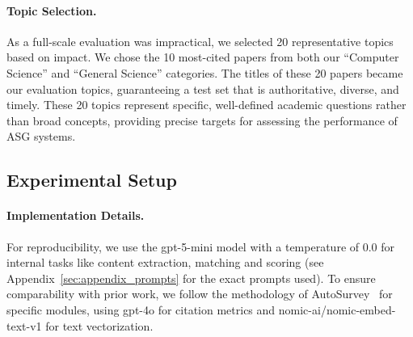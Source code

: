 \documentclass[11pt]{article}
\begin{document}




\paragraph{Topic Selection.} As a full-scale evaluation was impractical, we selected 20 representative topics based on impact. We chose the 10 most-cited papers from both our ``Computer Science'' and ``General Science'' categories. The titles of these 20 papers became our evaluation topics, guaranteeing a test set that is authoritative, diverse, and timely. These 20 topics represent specific, well-defined academic questions rather than broad concepts, providing precise targets for assessing the performance of ASG systems.






\subsection{Experimental Setup}

\paragraph{Implementation Details.} For reproducibility, we use the gpt-5-mini model with a temperature of $0.0$ for internal tasks like content extraction, matching and scoring (see Appendix~\ref{sec:appendix_prompts} for the exact prompts used).
To ensure comparability with prior work, we follow the methodology of AutoSurvey~\cite{wang2024autosurvey} for specific modules, using gpt-4o for citation metrics and nomic-ai/nomic-embed-text-v1 for text vectorization.
\end{document}
